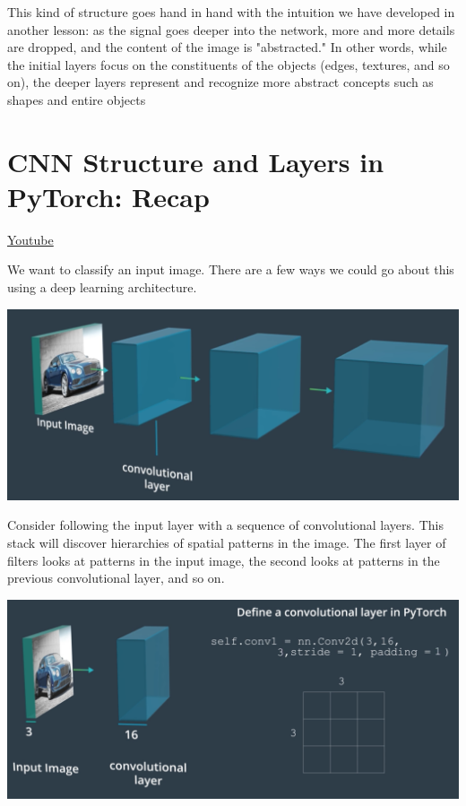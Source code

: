 This kind of structure goes hand in hand with the intuition we have developed in another lesson: as the signal goes deeper into the network, more and more details are dropped, and the content of the image is "abstracted." In other words, while the initial layers focus on the constituents of the objects (edges, textures, and so on), the deeper layers represent and recognize more abstract concepts such as shapes and entire objects


\section{CNN Structure and Layers in PyTorch: Recap}
\href{https://www.youtube.com/watch?v=smaw5GqRaoY&t=2s&ab_channel=Udacity}{Youtube} \newline

We want to classify an input image. There are a few ways we could go about this using a deep learning architecture.

\includegraphics[width=0.75\linewidth]{img//cnn//depth/image6.png}

Consider following the input layer with a sequence of convolutional layers. This stack will discover hierarchies of spatial patterns in the image. The first layer of filters looks at patterns in the input image, the second looks at patterns in the previous convolutional layer, and so on. 

\includegraphics[width=0.75\linewidth]{img//cnn//depth/image7.png}

